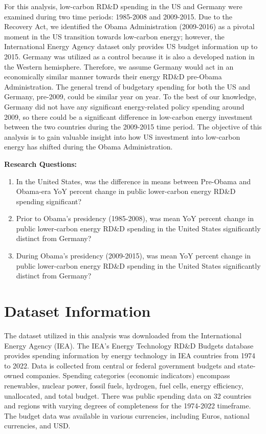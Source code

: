 \documentclass[
  12pt,
]{article}
\begin{document}
For this analysis, low-carbon RD\&D spending in the US and Germany were
examined during two time periods: 1985-2008 and 2009-2015. Due to the
Recovery Act, we identified the Obama Administration (2009-2016) as a
pivotal moment in the US transition towards low-carbon energy; however,
the International Energy Agency dataset only provides US budget
information up to 2015. Germany was utilized as a control because it is
also a developed nation in the Western hemisphere. Therefore, we assume
Germany would act in an economically similar manner towards their energy
RD\&D pre-Obama Administration. The general trend of budgetary spending
for both the US and Germany, pre-2009, could be similar year on year. To
the best of our knowledge, Germany did not have any significant
energy-related policy spending around 2009, so there could be a
significant difference in low-carbon energy investment between the two
countries during the 2009-2015 time period. The objective of this
analysis is to gain valuable insight into how US investment into
low-carbon energy has shifted during the Obama Administration.

\textbf{Research Questions:}

\begin{enumerate}
\def\labelenumi{\arabic{enumi}.}
\item
  In the United States, was the difference in means between Pre-Obama
  and Obama-era YoY percent change in public lower-carbon energy RD\&D
  spending significant?
\item
  Prior to Obama's presidency (1985-2008), was mean YoY percent change
  in public lower-carbon energy RD\&D spending in the United States
  significantly distinct from Germany?
\item
  During Obama's presidency (2009-2015), was mean YoY percent change in
  public lower-carbon energy RD\&D spending in the United States
  significantly distinct from Germany?
\end{enumerate}

\newpage

\hypertarget{dataset-information}{%
\section{Dataset Information}\label{dataset-information}}

The dataset utilized in this analysis was downloaded from the
International Energy Agency (IEA). The IEA's Energy Technology RD\&D
Budgets database provides spending information by energy technology in
IEA countries from 1974 to 2022. Data is collected from central or
federal government budgets and state-owned companies. Spending
categories (economic indicators) encompass renewables, nuclear power,
fossil fuels, hydrogen, fuel cells, energy efficiency, unallocated, and
total budget. There was public spending data on 32 countries and regions
with varying degrees of completeness for the 1974-2022 timeframe. The
budget data was available in various currencies, including Euros,
national currencies, and USD.
\end{document}
